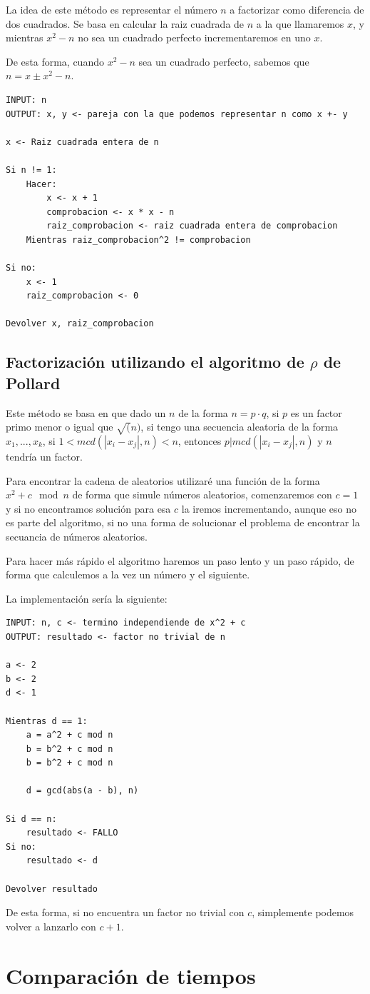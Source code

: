 \documentclass[12pt, spanish]{article}
\begin{document}
La idea de este método es representar el número $n$ a factorizar como diferencia de dos cuadrados. Se basa en calcular la raiz cuadrada de $n$ a la que llamaremos $x$, y mientras $x^2 - n$ no sea un cuadrado perfecto incrementaremos en uno $x$.

De esta forma, cuando $x^2 - n$ sea un cuadrado perfecto, sabemos que $n = x \pm x^2 - n$.


\begin{lstlisting}[caption={Algoritmo raices cuadradas mod p*q}]
INPUT: n
OUTPUT: x, y <- pareja con la que podemos representar n como x +- y

x <- Raiz cuadrada entera de n

Si n != 1:
 	Hacer:
		x <- x + 1
		comprobacion <- x * x - n
		raiz_comprobacion <- raiz cuadrada entera de comprobacion
	Mientras raiz_comprobacion^2 != comprobacion

Si no:
	x <- 1
	raiz_comprobacion <- 0

Devolver x, raiz_comprobacion
\end{lstlisting}



\subsection{Factorización utilizando el algoritmo de $\rho$ de Pollard}

Este método se basa en que dado un $n$ de la forma $n = p \cdot q$, si $p$ es un factor primo menor o igual que $\sqrt(n)$, si tengo una secuencia aleatoria de la forma $x_1, ..., x_k$, si $1 < mcd(|x_i - x_j|, n) < n$, entonces $p | mcd(|x_i - x_j|, n)$ y $n$ tendría un factor.

Para encontrar la cadena de aleatorios utilizaré una función de la forma $x^2 + c \mod n$ de forma que simule números aleatorios, comenzaremos con $c = 1$ y si no encontramos solución para esa $c$ la iremos incrementando, aunque eso no es parte del algoritmo, si no una forma de solucionar el problema de encontrar la secuancia de números aleatorios.

Para hacer más rápido el algoritmo haremos un paso lento y un paso rápido, de forma que calculemos a la vez un número y el siguiente.

La implementación sería la siguiente:


\begin{lstlisting}[caption={Algoritmo rho de Pollard}]
INPUT: n, c <- termino independiende de x^2 + c
OUTPUT: resultado <- factor no trivial de n

a <- 2
b <- 2
d <- 1

Mientras d == 1:
	a = a^2 + c mod n
	b = b^2 + c mod n
	b = b^2 + c mod n

	d = gcd(abs(a - b), n)

Si d == n:
	resultado <- FALLO
Si no:
	resultado <- d

Devolver resultado
\end{lstlisting}

De esta forma, si no encuentra un factor no trivial con $c$, simplemente podemos volver a lanzarlo con $c + 1$.

\section{Comparación de tiempos}


%
%
\end{document}
